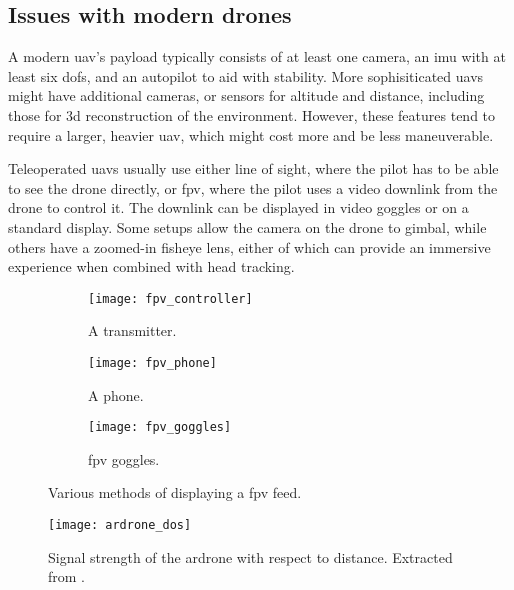 \subsection{Issues with modern drones}
A modern \gls{uav}'s payload typically consists of at least one camera, an \gls{imu} with at least six \glspl{dof}, and an autopilot to aid with stability.
More sophisiticated \glspl{uav} might have additional cameras, or sensors for altitude and distance, including those for \gls{3d} reconstruction of the environment.
However, these features tend to require a larger, heavier \gls{uav}, which might cost more and be less maneuverable.

Teleoperated \glspl{uav} usually use either line of sight, where the pilot has to be able to see the drone directly, or \gls{fpv}, where the pilot uses a video downlink from the drone to control it.
The downlink can be displayed in video goggles or on a standard display.
Some setups allow the camera on the drone to gimbal, while others have a zoomed-in fisheye lens, either of which can provide an immersive experience when combined with head tracking.

\begin{figure}[h]
  \centering
  \begin{subfigure}[b]{0.3\textwidth}
    \texttt{[image: fpv\_controller]}
    \caption{A transmitter.\cite{fpv_controller}}
    \label{fig:fpv_controller}
  \end{subfigure}
  \hfill
  \begin{subfigure}[b]{0.3\textwidth}
    \texttt{[image: fpv\_phone]}
    \caption{A phone.\cite{fpv_phone}}
    \label{fig:fpv_phone}
  \end{subfigure}
  \hfill
  \begin{subfigure}[b]{0.3\textwidth}
    \texttt{[image: fpv\_goggles]}
    \caption{\gls{fpv} goggles.\cite{fpv_goggles}}
    \label{fig:fpv_goggles}
  \end{subfigure}
  \caption[\acrshort{fpv} display methods]{Various methods of displaying a \gls{fpv} feed.}
  \label{fig:fpv_various}
\end{figure}

\begin{wrapfigure}{r}{0.47\textwidth}
  \centering
  \texttt{[image: ardrone\_dos]}
  \caption[AR.Drone signal profile]{
    Signal strength of the \gls{ardrone} with respect to distance.
    Extracted from \cite{ardrone_dos}.
  }
  \label{fig:ardrone_dos}
\end{wrapfigure}

